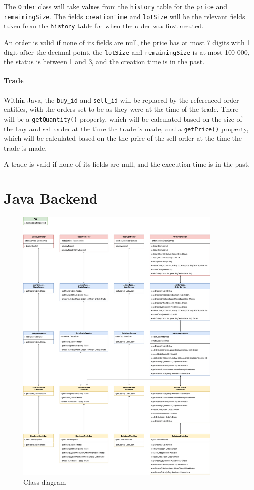 \documentclass{article}
\begin{document}
The \texttt{Order} class will take values from the \texttt{history} table for the \texttt{price} and \texttt{remainingSize}. The fields \texttt{creationTime} and \texttt{lotSize} will be the relevant fields taken from the \texttt{history} table for when the order was first created.

An order is valid if none of its fields are null, the price has at most 7 digits with 1 digit after the decimal point, the \texttt{lotSize} and \texttt{remainingSize} is at most 100 000, the status is between 1 and 3, and the creation time is in the past.

\paragraph{Trade} Within Java, the \texttt{buy\_id} and \texttt{sell\_id} will be replaced by the referenced order entities, with the orders set to be as they were at the time of the trade. There will be a \texttt{getQuantity()} property, which will be calculated based on the size of the buy and sell order at the time the trade is made, and a \texttt{getPrice()} property, which will be calculated based on the the price of the sell order at the time the trade is made. 

A trade is valid if none of its fields are null, and the execution time is in the past.

\section{Java Backend}

\begin{figure}[h]
    \centering
    \includegraphics[width=0.9\textwidth]{class-diagram.png}
    \caption{Class diagram}
\end{figure}
\end{document}
